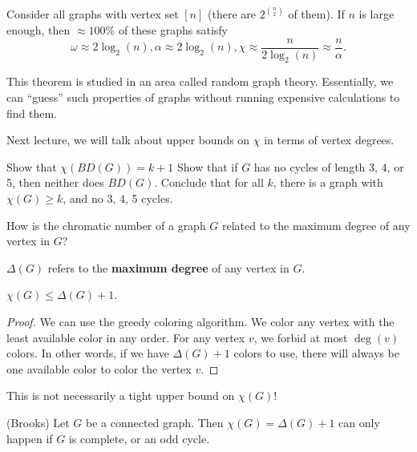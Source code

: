 \documentclass[a4paper]{article}
\begin{document}
\begin{theorem}
	Consider all graphs with vertex set \( [n] \) (there are \( 2^{\binom{n}{2}} \) of them). If \( n \) is large enough, then \( \approx 100\% \) of these graphs satisfy \[
		\omega \approx 2\log_2(n), \alpha \approx 2\log_2(n), \chi \approx \frac{n}{2\log_2(n)} \approx \frac{n}{\alpha }
	.\] 
\end{theorem}

This theorem is studied in an area called random graph theory. Essentially, we can ``guess'' such properties of graphs without running expensive calculations to find them.

Next lecture, we will talk about upper bounds on \( \chi  \) in terms of vertex degrees.

Show that \( \chi(BD(G)) = k + 1 \)
Show that if \( G \) has no cycles of length 3, 4, or 5, then neither does \( BD(G) \). Conclude that for all \( k \), there is a graph with \( \chi(G) \ge  k \), and no 3, 4, 5 cycles.



How is the chromatic number of a graph \( G \) related to the maximum degree of any vertex in \( G \)?

\begin{definition}
	\( \Delta (G) \) refers to the \textbf{maximum degree} of any vertex in \( G \).
\end{definition}

\begin{prop}
	\( \chi(G) \le \Delta(G) + 1 \).
\end{prop}

\begin{proof}
	We can use the greedy coloring algorithm. We color any vertex with the least available color in any order. For any vertex \( v \), we forbid at most \( \deg(v)	 \) colors. In other words, if we have \( \Delta(G) + 1 \) colors to use, there will always be one available color to color the vertex \( v \).
\end{proof}

\begin{note}
	This is not necessarily a tight upper bound on \( \chi(G) \)!
\end{note}

\begin{theorem}
	(Brooks) Let \( G \) be a connected graph. Then \( \chi(G) = \Delta(G) + 1 \) can only happen if \( G \) is complete, or an odd cycle.
\end{theorem}
\end{document}
